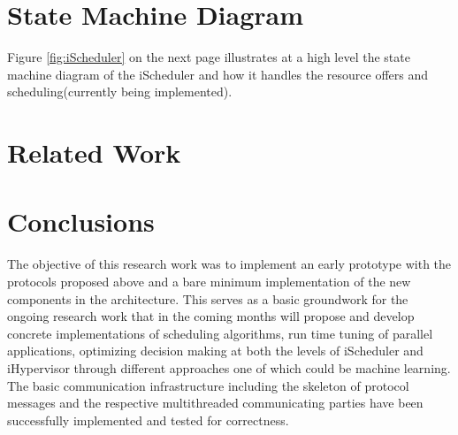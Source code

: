 \documentclass{acm_proc_article-sp}
\begin{document}
\section{State Machine Diagram}
Figure \ref{fig:iScheduler} on the next page illustrates at a high level the state machine diagram of the iScheduler and how it handles the resource offers and scheduling(currently being implemented).
\section{Related Work}
\section{Conclusions}
The objective of this research work was to implement an early prototype with the protocols proposed above and a bare minimum implementation of the new components in the architecture. This serves as a basic groundwork for the ongoing research work that in the coming months will propose and develop concrete implementations of scheduling algorithms, run time tuning of parallel applications, optimizing decision making at both the levels of iScheduler and iHypervisor through different approaches one of which could be machine learning. The basic communication infrastructure including the skeleton of protocol messages and the respective multithreaded communicating parties have been successfully implemented and tested for correctness.


\nocite{felix,laxmikant,nikolas,rudolph,isaias,andreas,georgiou,travis,gladys,klein,pavan,jette,slurm,torque}
%
%
\balancecolumns
\end{document}
